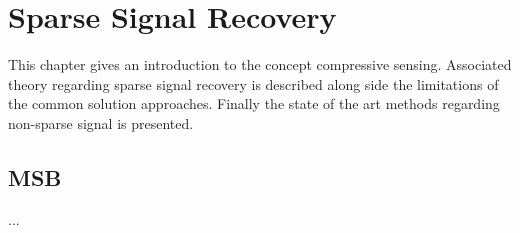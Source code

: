 \chapter{Sparse Signal Recovery}
This chapter gives an introduction to the concept compressive sensing. Associated theory regarding sparse signal recovery is described along side the limitations of the common solution approaches. Finally the state of the art methods regarding non-sparse signal is presented. 
    




\section{MSB}\label{sec:M-SBL}
...
%